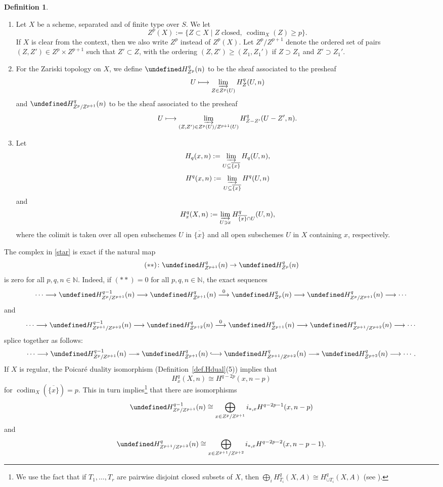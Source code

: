 \documentclass[10pt,a4paper]{article}
\let\cal\undefined
\numberwithin{equation}{section}
\newtheorem{Key lemma}[theorem]{Key lemma}
\theoremstyle{definition}
\newtheorem{definition}[theorem]{Definition}
\theoremstyle{remark}
\newcommand{\To}{\longrightarrow}
\newcommand{\cal}{\mathcal}
\DeclareMathOperator{\codim}{codim}
\newcommand{\xTo}[1]{\stackrel{#1}{\To}}
\newcommand{\longtwoheadrightarrow}{\relbar\joinrel\twoheadrightarrow}
\newcommand{\longhookrightarrow}{\lhook\joinrel\longrightarrow}
\begin{document}
\begin{definition}\leavevmode
\begin{enumerate}
\item Let $X$ be a scheme, separated and of finite type over $S$. We let
  $$Z^p(X):=\{Z\subset X \mid Z\;\mathrm{ closed},\ \codim_X(Z)\geq p\}.$$
If $X$ is clear from the context, then we also write $Z^p$ instead of $Z^p(X)$. Let $Z^p/Z^{p+1}$ denote the ordered set of pairs $(Z, Z')\in Z^p\times Z^{p+1}$ such that $Z'\subset Z$, with the ordering $(Z,Z')\geq (Z_1,Z_1')$ if $Z\supset Z_1$ and $Z'\supset Z_1'$.
\item For the Zariski topology on $X$, we define $\cal H^q_{Z^p}(n)$ to be the sheaf associated to the presheaf
$$U\longmapsto \varinjlim_{Z\in Z^p(U)} H^q_{Z}(U,n)$$
and $\cal H^q_{Z^p/Z^{p+1}}(n)$ to be the sheaf associated to the presheaf
$$U\longmapsto \varinjlim_{(Z,Z')\in Z^p(U)/Z^{p+1}(U)} H^q_{Z-Z'}(U-Z',n).$$
\item Let
$$H_q(x,n):=\varinjlim_{U\subseteq \overline{\{x\}}} H_q(U,n),$$
$$H^q(x,n):=\varinjlim_{U\subseteq \overline{\{x\}}} H^q(U,n)$$
and
$$H^q_x(X,n):=\varinjlim_{U\ni x} H^q_{\overline{\{x\}}\cap U}(U,n),$$
where the colimit is taken over all open subschemes $U$ in $\overline{\{x\}}$ and all open subschemes $U$ in $X$ containing $x$, respectively.
\end{enumerate}
\end{definition}

The complex in \eqref{star} is exact if the natural map
$$(**)\colon\cal H^q_{Z^{p+1}}(n)\to \cal H^q_{Z^p}(n)$$ is zero for all $p,q,n\in \mathbb{N}$. Indeed, if $(**)=0$ for all $p,q,n\in \mathbb{N}$, the exact sequences 
$$\cdots\To \cal H^{q-1}_{Z^p/Z^{p+1}}(n)\To\cal H^q_{Z^{p+1}}(n)\xTo{0} \cal H^q_{Z^p}(n)\To \cal H^{q}_{Z^p/Z^{p+1}}(n)\To\cdots$$
and
$$\cdots\To \cal H^{q-1}_{Z^{p+1}/Z^{p+2}}(n)\To\cal H^q_{Z^{p+2}}(n)\xTo{0} \cal H^q_{Z^{p+1}}(n)\To \cal H^{q}_{Z^{p+1}/Z^{p+2}}(n)\To\cdots $$
splice together as follows:
$$\cdots\To \cal H^{q-1}_{Z^p/Z^{p+1}}(n)\longtwoheadrightarrow\cal H^q_{Z^{p+1}}(n)\longhookrightarrow \cal H^q_{Z^{p+1}/Z^{p+2}}(n) \longtwoheadrightarrow \cal H^q_{Z^{p+2}}(n)\To\cdots .$$
If $X$ is regular, the Poicar\'e duality isomorphism (Definition~\ref{def.Hdual}(5)) implies that
$$H^q_x(X,n)\cong H^{q-2p}(x,n-p)$$
for $\codim_X(\overline{\{x\}})=p$. This in turn implies\footnote{We use the fact that if $T_1,\ldots,T_r$ are pairwise disjoint closed subsets of $X$, then $\bigoplus_i H^q_{T_i}(X,A)\cong H^q_{\cup T_i}(X,A)$ (see \cite[Lemma  1.2.1]{CHK97}).}  that there are isomorphisms 
$$
\cal H^{q-1}_{Z^p/Z^{p+1}}(n)\cong \bigoplus_{x\in Z^p/Z^{p+1}}i_{*,x}H^{q-2p-1}(x,n-p)
$$
and
$$
\cal H^{q}_{Z^{p+1}/Z^{p+2}}(n)\cong \bigoplus_{x\in Z^{p+1}/Z^{p+2}}i_{*,x}H^{q-2p-2}(x,n-p-1).
$$
\end{document}
